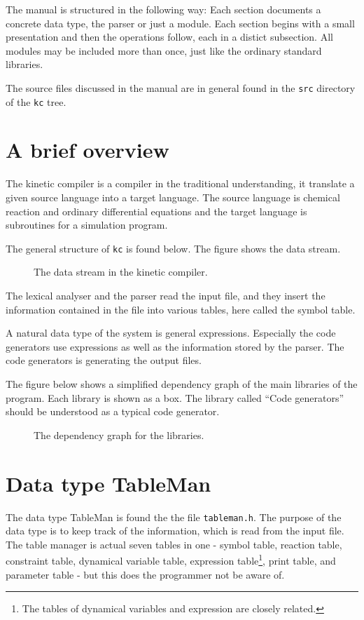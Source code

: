 The manual is structured in the following way: Each section documents a
concrete data type, the parser or just a module. Each 
section begins with a small presentation and then the operations
follow, each in a distict subsection. All modules may be included
more than once, \ie just like the ordinary standard libraries.

The source files discussed in the manual are in general found in the
{\tt src} directory of the {\tt kc} tree.

\section{A brief overview}
The kinetic compiler is a compiler in the traditional understanding,
\ie it translate a given source language into a target language. The
source language is chemical reaction and ordinary differential
equations and the target language is subroutines for a simulation
program.

The general structure of {\tt kc} is found below. The figure shows the
data stream.

\begin{figure}
  \caption{The data stream in the kinetic compiler.}
\end{figure}

The lexical analyser and the parser read the input file, and they
insert the information contained in the file into various tables, here
called the symbol table.

A natural data type of the system is general expressions. Especially
the code generators use expressions as well as the information stored
by the parser. The code generators is generating the output files.

The figure below shows a simplified dependency graph of the main
libraries of the program. Each library is shown as a box. The library
called ``Code generators'' should be understood as a typical code
generator.

\begin{figure}
  \caption{The dependency graph for the libraries.}
\end{figure}

\section{Data type TableMan}
\label{tableman}
The data type TableMan is found the the file {\tt tableman.h}. The
purpose of the data type is to keep track
of the information, which is read from the input file. The table
manager is actual seven tables in one - 
symbol table, reaction table, constraint table, dynamical variable
table, expression table\footnote{The tables of dynamical variables and
  expression are closely related.}, print table, 
and parameter table - but this does the programmer not be aware of.

